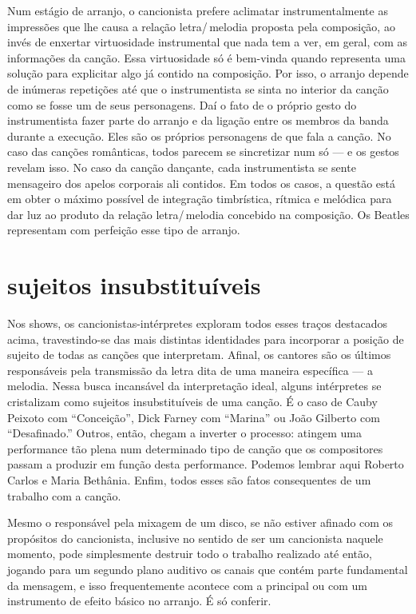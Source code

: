 Num estágio de arranjo, o cancionista prefere aclimatar
instrumentalmente as impressões que lhe causa a relação letra/\,melodia
proposta pela composição, ao invés de enxertar virtuosidade
instrumental que nada tem a ver, em geral, com as informações da canção.
Essa virtuosidade só é bem-vinda quando representa uma solução para
explicitar algo já contido na composição. Por isso, o arranjo depende de
inúmeras repetições até que o instrumentista se sinta no interior da
canção como se fosse um de seus personagens. Daí o fato de o próprio
gesto do instrumentista fazer parte do arranjo e da ligação entre os
membros da banda durante a execução. Eles são os próprios personagens de
que fala a canção. No caso das canções românticas, todos parecem se
sincretizar num só --- e os gestos revelam isso. No caso da canção
dançante, cada instrumentista se sente mensageiro dos apelos corporais
ali contidos. Em todos os casos, a questão está em obter o máximo
possível de integração timbrística, rítmica e melódica para dar luz ao
produto da relação letra/\,melodia concebido na composição. Os Beatles
representam com perfeição esse tipo de arranjo.

\section{sujeitos insubstituíveis}

Nos shows, os cancionistas-intérpretes exploram todos esses traços
destacados acima, travestindo-se das mais distintas identidades para
incorporar a posição de sujeito de todas as canções que interpretam.
Afinal, os cantores são os últimos responsáveis pela transmissão da
letra dita de uma maneira específica --- a melodia. Nessa
busca incansável da interpretação ideal, alguns intérpretes se cristalizam
como sujeitos insubstituíveis de uma canção. É o caso de Cauby Peixoto
com ``Conceição'', Dick Farney com ``Marina'' ou João Gilberto com
``Desafinado.'' Outros, então, chegam a inverter o processo: atingem
uma performance tão plena num determinado tipo de canção que os compositores
passam a produzir em função desta performance. Podemos lembrar aqui
Roberto Carlos e Maria Bethânia. Enfim, todos esses são fatos
consequentes de um trabalho com a canção.

Mesmo o responsável pela mixagem de um disco, se não estiver afinado com
os propósitos do cancionista, inclusive no sentido de ser um cancionista
naquele momento, pode simplesmente destruir todo o trabalho realizado
até então, jogando para um segundo plano auditivo os canais que contém
parte fundamental da mensagem, e isso frequentemente acontece com a
principal ou com um instrumento de efeito básico no arranjo. É só
conferir.

